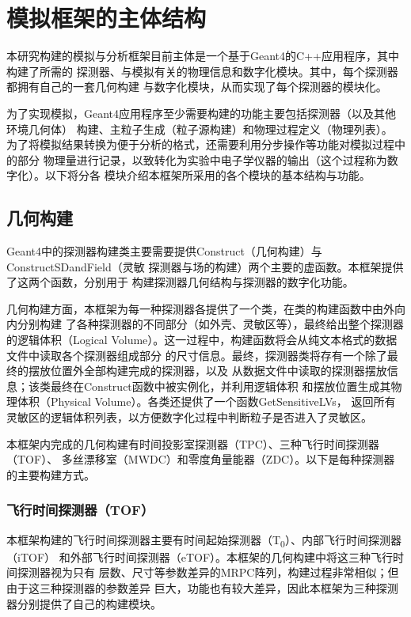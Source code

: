 \documentclass[bachelor,openany,oneside,color]{buaathesis}
\def\TZ{T\textsubscript{0}}
\begin{document}

\chapter{模拟框架的主体结构}

本研究构建的模拟与分析框架目前主体是一个基于Geant4的C++应用程序，其中构建了所需的
探测器、与模拟有关的物理信息和数字化模块。其中，每个探测器都拥有自己的一套几何构建
与数字化模块，从而实现了每个探测器的模块化。

为了实现模拟，Geant4应用程序至少需要构建的功能主要包括探测器（以及其他环境几何体）
构建、主粒子生成（粒子源构建）和物理过程定义（物理列表）。\cite{Geant4}
为了将模拟结果转换为便于分析的格式，还需要利用分步操作等功能对模拟过程中的部分
物理量进行记录，以致转化为实验中电子学仪器的输出（这个过程称为数字化）。以下将分各
模块介绍本框架所采用的各个模块的基本结构与功能。

\section{几何构建}

Geant4中的探测器构建类主要需要提供Construct（几何构建）与ConstructSDandField（灵敏
探测器与场的构建）两个主要的虚函数。\cite{Geant4}本框架提供了这两个函数，分别用于
构建探测器几何结构与探测器的数字化功能。

几何构建方面，本框架为每一种探测器各提供了一个类，在类的构建函数中由外向内分别构建
了各种探测器的不同部分（如外壳、灵敏区等），最终给出整个探测器的逻辑体积（Logical
Volume）。这一过程中，构建函数将会从纯文本格式的数据文件中读取各个探测器组成部分
的尺寸信息。最终，探测器类将存有一个除了最终的摆放位置外全部构建完成的探测器，以及
从数据文件中读取的探测器摆放信息；该类最终在Construct函数中被实例化，并利用逻辑体积
和摆放位置生成其物理体积（Physical Volume）。各类还提供了一个函数GetSensitiveLVs，
返回所有灵敏区的逻辑体积列表，以方便数字化过程中判断粒子是否进入了灵敏区。

本框架内完成的几何构建有时间投影室探测器（TPC）、三种飞行时间探测器（TOF）、
多丝漂移室（MWDC）和零度角量能器（ZDC）。以下是每种探测器的主要构建方式。

\subsection{飞行时间探测器（TOF）}\label{ssec:det:tof}

本框架构建的飞行时间探测器主要有时间起始探测器（\TZ）、内部飞行时间探测器（iTOF）
和外部飞行时间探测器（eTOF）。本框架的几何构建中将这三种飞行时间探测器视为只有
层数、尺寸等参数差异的MRPC阵列，构建过程非常相似；但由于这三种探测器的参数差异
巨大，功能也有较大差异，因此本框架为三种探测器分别提供了自己的构建模块。
\end{document}
